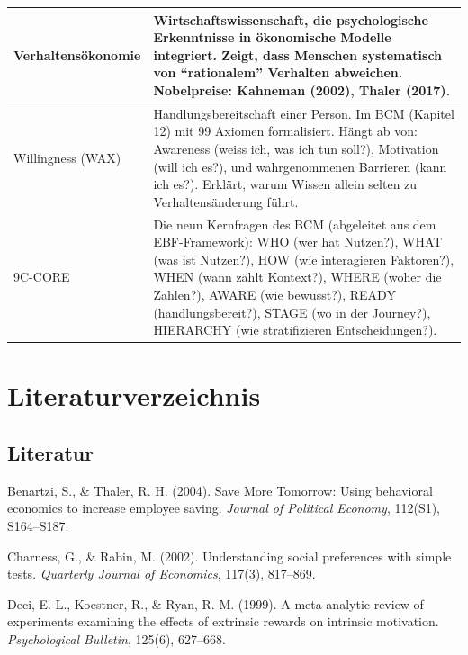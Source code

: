 \documentclass[11pt,a4paper]{article}
\begin{document}
\begin{longtable}{@{}L{4cm}L{10cm}@{}}
\midrule
Verhaltensökonomie & Wirtschaftswissenschaft, die psychologische Erkenntnisse in ökonomische Modelle integriert. Zeigt, dass Menschen systematisch von ``rationalem'' Verhalten abweichen. Nobelpreise: Kahneman (2002), Thaler (2017). \\
\midrule
Willingness (WAX) & Handlungsbereitschaft einer Person. Im BCM (Kapitel 12) mit 99 Axiomen formalisiert. Hängt ab von: Awareness (weiss ich, was ich tun soll?), Motivation (will ich es?), und wahrgenommenen Barrieren (kann ich es?). Erklärt, warum Wissen allein selten zu Verhaltensänderung führt. \\
\midrule
9C-CORE & Die neun Kernfragen des BCM (abgeleitet aus dem EBF-Framework): WHO (wer hat Nutzen?), WHAT (was ist Nutzen?), HOW (wie interagieren Faktoren?), WHEN (wann zählt Kontext?), WHERE (woher die Zahlen?), AWARE (wie bewusst?), READY (handlungsbereit?), STAGE (wo in der Journey?), HIERARCHY (wie stratifizieren Entscheidungen?). \\
\bottomrule
\end{longtable}

\newpage


\section*{Literaturverzeichnis}

\subsection*{Literatur}

Benartzi, S., \& Thaler, R. H. (2004). Save More Tomorrow: Using behavioral economics to increase employee saving. \textit{Journal of Political Economy}, 112(S1), S164--S187.

\vspace{0.3cm}
Charness, G., \& Rabin, M. (2002). Understanding social preferences with simple tests. \textit{Quarterly Journal of Economics}, 117(3), 817--869.

\vspace{0.3cm}
Deci, E. L., Koestner, R., \& Ryan, R. M. (1999). A meta-analytic review of experiments examining the effects of extrinsic rewards on intrinsic motivation. \textit{Psychological Bulletin}, 125(6), 627--668.
\end{document}
